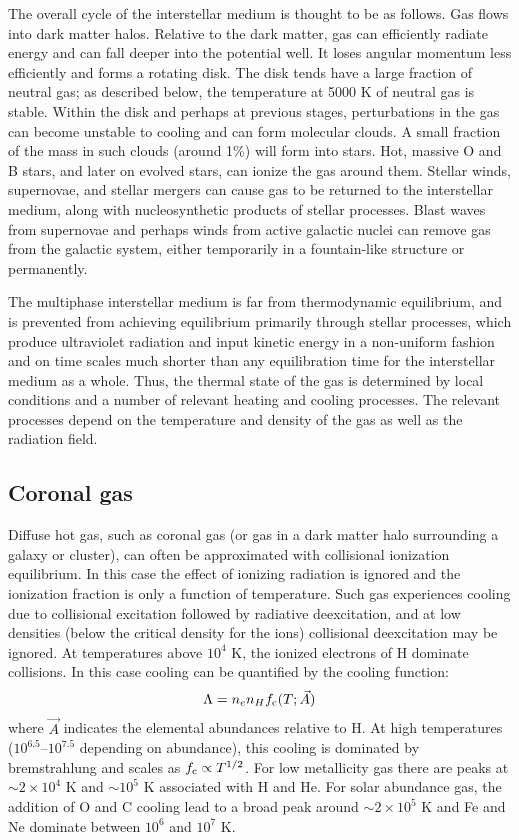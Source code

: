 The overall cycle of the interstellar medium is thought to be as
follows. Gas flows into dark matter halos. Relative to the dark
matter, gas can efficiently radiate energy and can fall deeper into
the potential well. It loses angular momentum less efficiently and
forms a rotating disk. The disk tends have a large fraction of neutral
gas; as described below, the temperature at 5000 K of neutral gas is
stable. Within the disk and perhaps at previous stages, perturbations
in the gas can become unstable to cooling and can form molecular
clouds. A small fraction of the mass in such clouds (around 1\%) will
form into stars. Hot, massive O and B stars, and later on evolved
stars, can ionize the gas around them. Stellar winds, supernovae, and
stellar mergers can cause gas to be returned to the interstellar
medium, along with nucleosynthetic products of stellar processes.
Blast waves from supernovae and perhaps winds from active galactic
nuclei can remove gas from the galactic system, either temporarily in
a fountain-like structure or permanently.

The multiphase interstellar medium is far from thermodynamic
equilibrium, and is prevented from achieving equilibrium primarily
through stellar processes, which produce ultraviolet radiation and
input kinetic energy in a non-uniform fashion and on time scales much
shorter than any equilibration time for the interstellar medium as a
whole. Thus, the thermal state of the gas is determined by local
conditions and a number of relevant heating and cooling processes. The
relevant processes depend on the temperature and density of the gas as
well as the radiation field.

\subsection{Coronal gas}

Diffuse hot gas, such as coronal gas (or gas in a dark matter halo
surrounding a galaxy or cluster), can often be approximated with
collisional ionization equilibrium. In this case the effect of
ionizing radiation is ignored and the ionization fraction is only a
function of temperature. Such gas experiences cooling due to
collisional excitation followed by radiative deexcitation, and at low
densities (below the critical density for the ions) collisional
deexcitation may be ignored. At temperatures above $10^4$ K, the
ionized electrons of H dominate collisions. In this case cooling can
be quantified by the cooling function:
\begin{equation}
\Lambda = n_e n_H f_{\rm c} (T; \vec{A})
\end{equation}
where $\vec{A}$ indicates the elemental abundances relative to H. At
high temperatures ($10^{6.5}$--$10^{7.5}$ depending on abundance),
this cooling is dominated by bremstrahlung and scales as $f_{\rm
c} \propto T^{1/2}$. For low metallicity gas there are peaks at $\sim
2\times 10^4$ K and $\sim 10^5$ K associated with H and He. For solar
abundance gas, the addition of O and C cooling lead to a broad peak
around $\sim 2 \times 10^5$ K and Fe and Ne dominate between $10^6$
and $10^7$ K.

